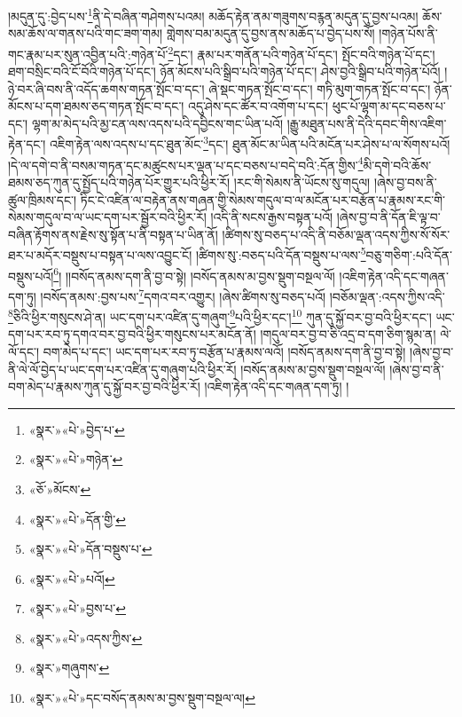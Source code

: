 །མདུན་དུ་:བྱེད་པས་\footnote{«སྣར་»«པེ་»བྱེད་པ་}ནི་དེ་བཞིན་གཤེགས་པའམ། མཆོད་རྟེན་ནམ་གཟུགས་བརྙན་མདུན་དུ་བྱས་པའམ། ཆོས་སམ་ཆོས་ལ་གནས་པའི་གང་ཟག་གམ། གླེགས་བམ་མདུན་དུ་བྱས་ནས་མཆོད་པ་བྱེད་པས་སོ། །གཉེན་པོས་ནི་གང་རྣམ་པར་སུན་འབྱིན་པའི་:གཉེན་པོ་\footnote{«སྣར་»«པེ་»གཉེན་}དང་། རྣམ་པར་གནོན་པའི་གཉེན་པོ་དང་། སྤོང་བའི་གཉེན་པོ་དང་། ཐག་བསྲིང་བའི་ངོ་བོའི་གཉེན་པོ་དང་། ཉོན་མོངས་པའི་སྒྲིབ་པའི་གཉེན་པོ་དང་། ཤེས་བྱའི་སྒྲིབ་པའི་གཉེན་པོའོ། །ཉེ་བར་ཞི་བས་ནི་འདོད་ཆགས་གཏན་སྤོང་བ་དང་། ཞེ་སྡང་གཏན་སྤོང་བ་དང་། གཏི་མུག་གཏན་སྤོང་བ་དང་། ཉོན་མོངས་པ་དག་ཐམས་ཅད་གཏན་སྤོང་བ་དང་། འདུ་ཤེས་དང་ཚོར་བ་འགོག་པ་དང་། ཕུང་པོ་ལྷག་མ་དང་བཅས་པ་དང་། ལྷག་མ་མེད་པའི་མྱ་ངན་ལས་འདས་པའི་དབྱིངས་གང་ཡིན་པའོ། །རྒྱུ་མཐུན་པས་ནི་དེའི་དབང་གིས་འཇིག་རྟེན་དང་། འཇིག་རྟེན་ལས་འདས་པ་དང་ཐུན་མོང་\footnote{«ཅོ་»མོངས་}དང་། ཐུན་མོང་མ་ཡིན་པའི་མངོན་པར་ཤེས་པ་ལ་སོགས་པའོ། །དེ་ལ་དགེ་བ་ནི་བསམ་གཏན་དང་མཚུངས་པར་ལྡན་པ་དང་བཅས་པ་བདེ་བའི་:དོན་གྱིས་\footnote{«སྣར་»«པེ་»དོན་གྱི་}མི་དགེ་བའི་ཆོས་ཐམས་ཅད་ཀུན་དུ་སྤྱོད་པའི་གཉེན་པོར་གྱུར་པའི་ཕྱིར་རོ། །རང་གི་སེམས་ནི་ཡོངས་སུ་གདུལ། །ཞེས་བྱ་བས་ནི་ཚུལ་ཁྲིམས་དང་། ཏིང་ངེ་འཛིན་ལ་བརྟེན་ནས་གཞན་གྱི་སེམས་གདུལ་བ་ལ་མངོན་པར་བརྩོན་པ་རྣམས་རང་གི་སེམས་གདུལ་བ་ལ་ཡང་དག་པར་སྦྱོར་བའི་ཕྱིར་རོ། །འདི་ནི་སངས་རྒྱས་བསྟན་པའོ། །ཞེས་བྱ་བ་ནི་དོན་ཇི་ལྟ་བ་བཞིན་རྟོགས་ནས་རྗེས་སུ་སྟོན་པ་ནི་བསྟན་པ་ཡིན་ནོ། །ཚིགས་སུ་བཅད་པ་འདི་ནི་བཅོམ་ལྡན་འདས་ཀྱིས་སོ་སོར་ཐར་པ་མདོར་བསྡུས་པ་བསྟན་པ་ལས་འབྱུང་ངོ། །ཚིགས་སུ་:བཅད་པའི་དོན་བསྡུས་པ་ལས་\footnote{«སྣར་»«པེ་»དོན་བསྡུས་པ་}བཅུ་གཅིག་:པའི་དོན་བསྡུས་པའོ།\footnote{«སྣར་»«པེ་»པའོ།}། །།བསོད་ནམས་དག་ནི་བྱ་བ་སྟེ། །བསོད་ནམས་མ་བྱས་སྡུག་བསྔལ་ལོ། །འཇིག་རྟེན་འདི་དང་གཞན་དག་ཏུ། །བསོད་ནམས་:བྱས་པས་\footnote{«སྣར་»«པེ་»བྱས་པ་}དགའ་བར་འགྱུར། །ཞེས་ཚིགས་སུ་བཅད་པའོ། །བཅོམ་ལྡན་:འདས་ཀྱིས་འདི་\footnote{«སྣར་»«པེ་»འདས་ཀྱིས་}ཅིའི་ཕྱིར་གསུངས་ཤེ་ན། ཡང་དག་པར་འཛིན་དུ་གཞུག་\footnote{«སྣར་»གཞུགས་}པའི་ཕྱིར་དང་།\footnote{«སྣར་»«པེ་»དང་བསོད་ནམས་མ་བྱས་སྡུག་བསྔལ་ལ།} ཀུན་དུ་སྐྱོ་བར་བྱ་བའི་ཕྱིར་དང་། ཡང་དག་པར་རབ་ཏུ་དགའ་བར་བྱ་བའི་ཕྱིར་གསུངས་པར་མངོན་ནོ། །གདུལ་བར་བྱ་བ་ཅི་འདྲ་བ་དག་ཅིག་སྙམ་ན། ལེ་ལོ་དང་། བག་མེད་པ་དང་། ཡང་དག་པར་རབ་ཏུ་བརྩོན་པ་རྣམས་ལའོ། །བསོད་ནམས་དག་ནི་བྱ་བ་སྟེ། །ཞེས་བྱ་བ་ནི་ལེ་ལོ་བྱེད་པ་ཡང་དག་པར་འཛིན་དུ་གཞུག་པའི་ཕྱིར་རོ། །བསོད་ནམས་མ་བྱས་སྡུག་བསྔལ་ལོ། །ཞེས་བྱ་བ་ནི་བག་མེད་པ་རྣམས་ཀུན་དུ་སྐྱོ་བར་བྱ་བའི་ཕྱིར་རོ། །འཇིག་རྟེན་འདི་དང་གཞན་དག་ཏུ། །
